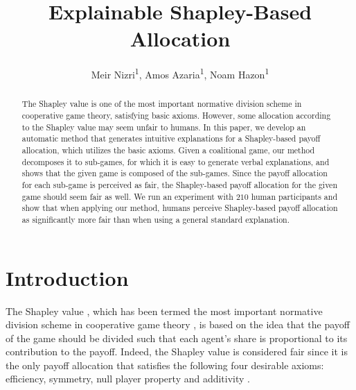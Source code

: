\documentclass[letterpaper]{article} %
\title{Explainable Shapley-Based Allocation}
\author {
    Meir Nizri\textsuperscript{\rm 1},
    Amos Azaria\textsuperscript{\rm 1},
    Noam Hazon\textsuperscript{\rm 1}
}
\begin{document}
\maketitle


\begin{abstract}
The Shapley value is one of the most important normative division scheme in cooperative game theory, satisfying basic axioms. However, some allocation according to the Shapley value may seem unfair to humans.
In this paper, we develop an automatic method that generates intuitive explanations for a Shapley-based payoff allocation, which utilizes the basic axioms.
Given a coalitional game, our method decomposes it to sub-games, for which it is easy to generate verbal explanations, and shows that the given game is composed of the sub-games.
Since the payoff allocation for each sub-game is perceived as fair, the Shapley-based payoff allocation for the given game should seem fair as well.
We run an experiment with $210$ human participants and show that when applying our method, humans perceive Shapley-based payoff allocation as significantly more fair than when using a general standard explanation.
\end{abstract}




\section{Introduction}

The Shapley value \cite{shapley1953value}, which has been termed the most important normative division scheme in cooperative game theory \cite{winter2002shapley},
is based on the idea that the payoff of the game should be divided such that each agent’s share is proportional to its contribution to the payoff.
Indeed, the Shapley value is considered fair since it is the only payoff allocation that satisfies the following four desirable axioms: efficiency, symmetry, null player property and additivity \cite{hart1989shapley}. %
\end{document}
